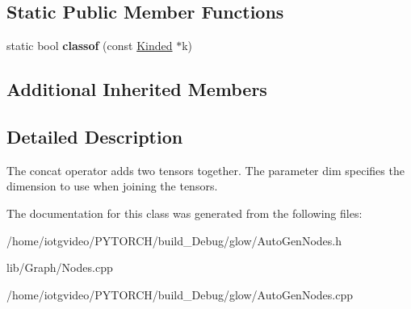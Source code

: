 \subsection*{Static Public Member Functions}
\begin{DoxyCompactItemize}
\item 
\mbox{\label{classglow_1_1_concat_node_a747b2cfa8c9e6b17de405ed994370427}} 
static bool {\bfseries classof} (const \hyperlink{classglow_1_1_kinded}{Kinded} $\ast$k)
\end{DoxyCompactItemize}
\subsection*{Additional Inherited Members}


\subsection{Detailed Description}
The concat operator adds two tensors together. The parameter \textquotesingle{}dim\textquotesingle{} specifies the dimension to use when joining the tensors. 

The documentation for this class was generated from the following files\+:\begin{DoxyCompactItemize}
\item 
/home/iotgvideo/\+P\+Y\+T\+O\+R\+C\+H/build\+\_\+\+Debug/glow/Auto\+Gen\+Nodes.\+h\item 
lib/\+Graph/Nodes.\+cpp\item 
/home/iotgvideo/\+P\+Y\+T\+O\+R\+C\+H/build\+\_\+\+Debug/glow/Auto\+Gen\+Nodes.\+cpp\end{DoxyCompactItemize}
